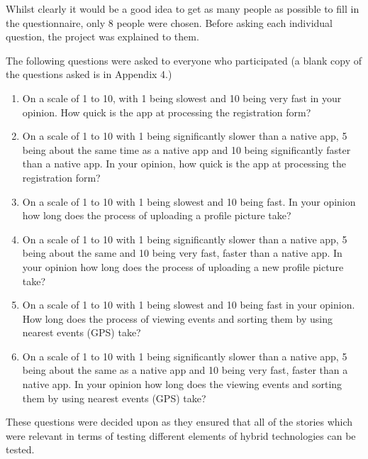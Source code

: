 Whilst clearly it would be a good idea to get as many people as possible to fill in the questionnaire, only 8 people were chosen. Before asking each individual question, the project was explained to them.

The following questions were asked to everyone who participated (a blank copy of the questions asked is in  Appendix 4.)

\begin{enumerate}
\item On a scale of 1 to 10, with 1 being slowest and 10 being very fast in your opinion. How quick is the app at processing the registration form?
\item On a scale of 1 to 10 with 1 being significantly slower than a native app, 5 being about the same time as a native app and 10 being significantly faster than a native app. In your opinion, how quick is the app at processing the registration form?
\item On a scale of 1 to 10 with 1 being slowest and 10 being fast. In your opinion how long does the process of uploading a profile picture take?
\item On a scale of 1 to 10 with 1 being significantly slower than a native app, 5 being about the same and 10 being very fast, faster than a native app. In your opinion how long does the process of uploading a new profile picture take?
\item On a scale of 1 to 10 with 1 being slowest and 10 being fast in your opinion. How long does the process of viewing events and sorting them by using nearest events (GPS) take?
\item On a scale of 1 to 10 with 1 being significantly slower than a native app, 5 being about the same as a native app and 10 being very fast, faster than a native app. In your opinion how long does the viewing events and sorting them by using nearest events (GPS) take?
\end{enumerate}
These questions were decided upon as they ensured that all of the stories which were relevant in terms of testing different elements of hybrid technologies can be tested.
